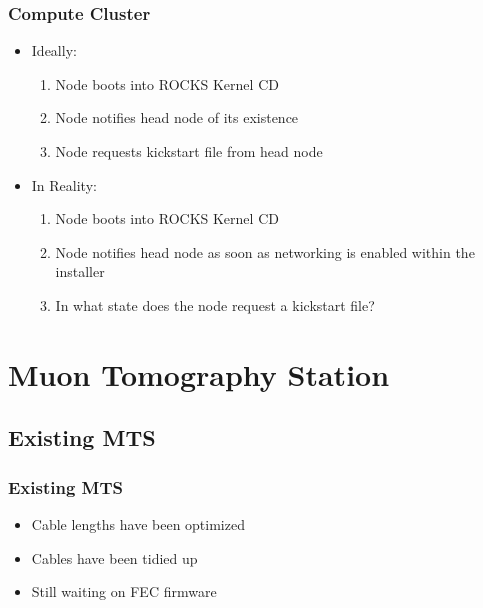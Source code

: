 \documentclass[aspectratio=169]{beamer}
\begin{document}
\begin{frame}

  \frametitle{Compute Cluster}

  \begin{multicols}{2}
    
    \begin{itemize}
      
    \item Ideally:
      \begin{enumerate}
      \item Node boots into ROCKS Kernel CD
      \item Node notifies head node of its existence
      \item Node requests kickstart file from head node
      \end{enumerate}
      
      \columnbreak
      
    \item In Reality:
      \begin{enumerate}
      \item Node boots into ROCKS Kernel CD
      \item Node notifies head node as soon as networking is enabled within
        the installer
      \item In what state does the node request a kickstart file?
      \end{enumerate}
      
    \end{itemize}
    
  \end{multicols}


\end{frame}


\section{Muon Tomography Station}


\subsection{Existing MTS}

\begin{frame}

  \frametitle{Existing MTS}

  \begin{itemize}
    \item Cable lengths have been optimized
    \item Cables have been tidied up
    \item Still waiting on FEC firmware
  \end{itemize}


\end{frame}
\end{document}
